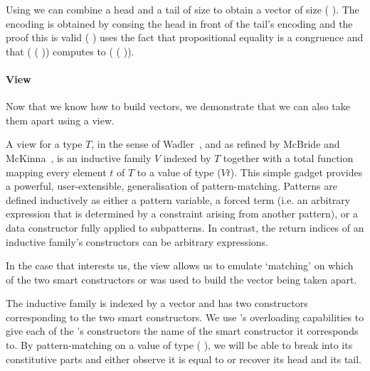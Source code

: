 
Using \IdrisFunction{(::)} we can combine a head and a tail of size 
to obtain a vector of size ( ).
%
The encoding is obtained by consing the head in front of the tail's encoding
and the proof this is valid
{(  )}
uses the fact that propositional
equality is a congruence and that
( ( \IdrisData{::} ))
computes to ( ( )).

\paragraph{View}
Now that we know how to build vectors, we demonstrate that we can also take
them apart using a view.

A view for a type $T$, in the sense of Wadler~\cite{DBLP:conf/popl/Wadler87},
and as refined by McBride and McKinna~\cite{DBLP:journals/jfp/McBrideM04},
is an inductive family $V$ indexed by $T$ together with a total function
mapping every element $t$ of $T$ to a value of type ($V t$).
%
This simple gadget provides a powerful, user-extensible, generalisation of
pattern-matching.
%
Patterns are defined inductively as either a pattern variable, a forced term
(i.e. an arbitrary expression that is determined by a constraint arising from
another pattern), or a data constructor fully applied to subpatterns.
%
In contrast, the return indices of an inductive family's constructors can be
arbitrary expressions.

In the case that interests us, the view allows us to emulate `matching'
on which of the two smart constructors  or \IdrisFunction{(::)}
was used to build the vector being taken apart.


The inductive family  is indexed by a vector and has two
constructors corresponding to the two smart constructors.
%
We use \idris{}'s overloading capabilities to give each of the
's constructors the name of the smart constructor
it corresponds to.
%
By pattern-matching on a value of type ( ),
we will be able to break  into its constitutive parts and
either observe it is equal to  or recover its head
and its tail.


